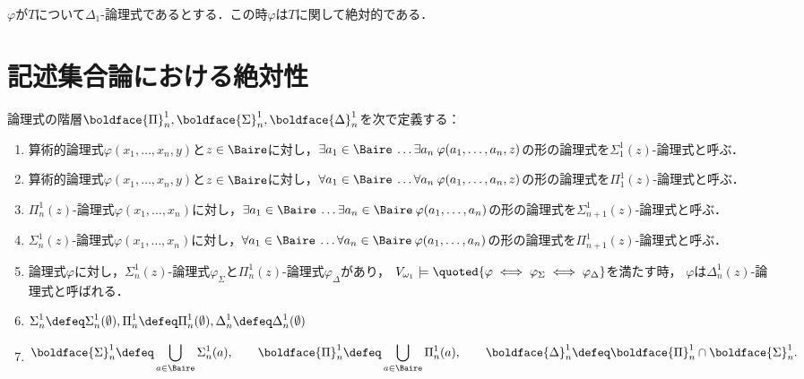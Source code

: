 \documentclass[xelatex,a4j,jadriver=standard]{bxjsarticle}
\begin{document}
\begin{theorem}
 $\varphi$が$T$について$\Delta_1$-論理式であるとする．この時$\varphi$は$T$に関して絶対的である．
\end{theorem}

\section{記述集合論における絶対性}

\begin{definition}
 論理式の階層$\boldface{\Pi}^1_n, \boldface{\Sigma}^1_n, \boldface{\Delta}^1_n$を次で定義する：
 \begin{enumerate}
  \item 算術的論理式$\varphi(x_1, \dots, x_n, y)$と$z \in \Baire$に対し，$\exists a_1 \in \Baire\: \dots \exists a_n\: \varphi(a_1, \dots, a_n, z)$の形の論理式を$\Sigma^1_1(z)$-論理式と呼ぶ．
  \item 算術的論理式$\varphi(x_1, \dots, x_n, y)$と$z \in \Baire$に対し，$\forall a_1 \in \Baire\: \dots \forall a_n\: \varphi(a_1, \dots, a_n, z)$の形の論理式を$\Pi^1_1(z)$-論理式と呼ぶ．
  \item $\Pi^1_n(z)$-論理式$\varphi(x_1, \dots, x_n)$に対し，$\exists a_1 \in \Baire\:\dots \exists a_n \in \Baire\: \varphi(a_1, \dots, a_n)$の形の論理式を$\Sigma^1_{n+1}(z)$-論理式と呼ぶ．
  \item $\Sigma^1_n(z)$-論理式$\varphi(x_1, \dots, x_n)$に対し，$\forall a_1 \in \Baire\:\dots \forall a_n \in \Baire\: \varphi(a_1, \dots, a_n)$の形の論理式を$\Pi^1_{n+1}(z)$-論理式と呼ぶ．
  \item 論理式$\varphi$に対し，$\Sigma^1_n(z)$-論理式$\varphi_\Sigma$と$\Pi^1_n(z)$-論理式$\varphi_\Delta$があり，
        $V_{\omega_1} \models \quoted{\varphi \iff \varphi_\Sigma \iff \varphi_\Delta}$を満たす時，
        $\varphi$は$\Delta^1_n(z)$-論理式と呼ばれる．
  \item $\begin{gathered}
         \Sigma^1_n \defeq \Sigma^1_n(\emptyset), \Pi^1_n \defeq \Pi^1_n(\emptyset), \Delta^1_n \defeq \Delta^1_n(\emptyset)\end{gathered}$
  \item $\begin{gathered}\boldface{\Sigma}^1_n \defeq \bigcup_{a \in \Baire} \Sigma^1_n(a), \qquad
        \boldface{\Pi}^1_n \defeq \bigcup_{a \in \Baire} \Pi^1_n(a), \qquad
        \boldface{\Delta}^1_n \defeq \boldface{\Pi}^1_n \cap \boldface{\Sigma}^1_n.\end{gathered}$
 \end{enumerate}
\end{definition}
\end{document}
